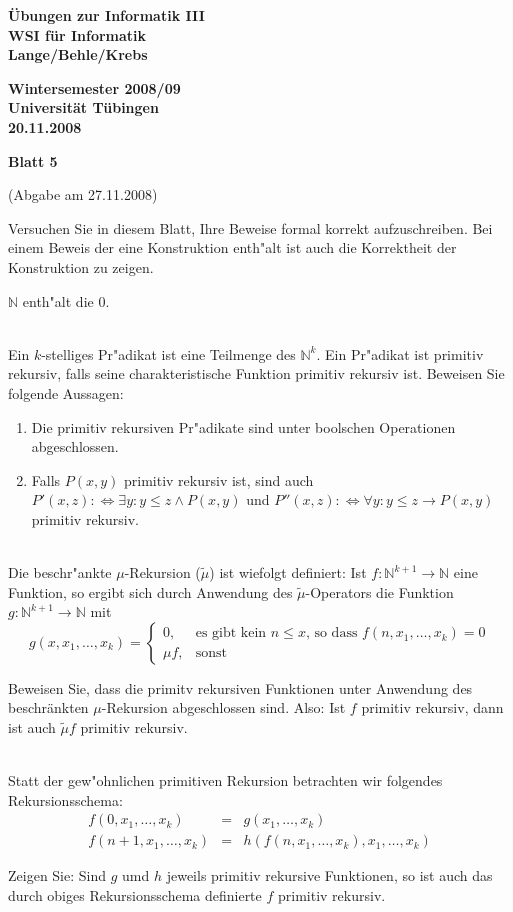 \documentclass[a4paper]{article}
\def\header#1#2#3{\pagestyle{empty}
\noindent
\begin{minipage}[t]{0.6\textwidth}
\begin{flushleft}
\bf \"Ubungen zur Informatik III\\
WSI f\"ur Informatik\\
Lange/Behle/Krebs
\end{flushleft}
\end{minipage}
\begin{minipage}[t]{0.4\textwidth}
\begin{flushright}
\bf Wintersemester 2008/09\\
Universit\"at T\"ubingen\\
#2 %
\end{flushright}
\end{minipage}

\begin{center}
{\Large\bf Blatt #1}

{(Abgabe am #3)}
\end{center}
}
\begin{document}
\header{5}{20.11.2008}{27.11.2008}

\bigskip
Versuchen Sie in diesem Blatt, Ihre Beweise formal korrekt aufzuschreiben. Bei einem Beweis der eine Konstruktion enth"alt ist auch die Korrektheit der Konstruktion zu zeigen.

$\mathbb{N}$ enth"alt die $0$.
\bigskip

\\
Ein $k$-stelliges Pr"adikat ist eine Teilmenge des $\mathbb{N}^k$.
Ein Pr"adikat ist primitiv rekursiv, falls seine charakteristische Funktion primitiv rekursiv ist.
Beweisen Sie folgende Aussagen:
\begin{enumerate}
\item Die primitiv rekursiven Pr"adikate sind unter boolschen Operationen abgeschlossen.
\item Falls $P(x,y)$ primitiv rekursiv ist, sind auch $P'(x,z):\Leftrightarrow\exists y: y\leq z\land P(x,y)$ und $P''(x,z):\Leftrightarrow\forall y: y\leq z\rightarrow  P(x,y)$ primitiv rekursiv.
\end{enumerate}
\bigskip


\\
Die beschr"ankte $\mu$-Rekursion ($\tilde\mu$) ist wiefolgt definiert:
Ist $f:\mathbb{N}^{k+1}\rightarrow \mathbb{N}$ eine Funktion, so ergibt sich durch Anwendung des $\tilde\mu$-Operators die Funktion $g:\mathbb{N}^{k+1}\rightarrow \mathbb{N}$ mit $$g(x,x_1,\ldots,x_k)=\left\{
\begin{array}{ll}
0,&\mbox{es gibt kein $n\leq x$, so dass }f(n,x_1,\ldots,x_k)=0\\
\mu f,&\mbox{sonst}
\end{array}\right.$$

Beweisen Sie, dass die primitv rekursiven Funktionen unter Anwendung des beschr\"ankten $\mu$-Rekursion abgeschlossen sind. Also: Ist $f$ primitiv rekursiv, dann ist auch $\tilde\mu f$ primitiv rekursiv.
\bigskip

\\
Statt der gew"ohnlichen primitiven Rekursion betrachten wir folgendes Rekursionsschema:
\begin{eqnarray*}
f(0,x_1,\ldots,x_k)&=&g(x_1,\ldots,x_k)\\
f(n+1,x_1,\ldots,x_k)&=&h(f(n,x_1,\ldots,x_k),x_1,\ldots,x_k)
\end{eqnarray*}

Zeigen Sie: Sind $g$ umd $h$ jeweils primitiv rekursive Funktionen, so ist auch das durch obiges Rekursionsschema definierte $f$ primitiv rekursiv.
\end{document}
